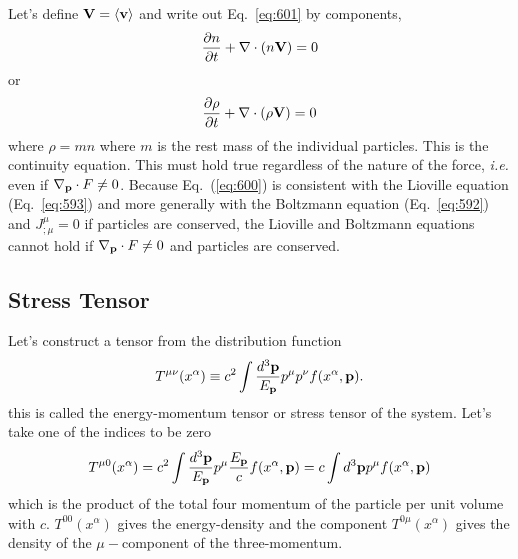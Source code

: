 Let's define ${\bf V}=\langle {\bf v} \rangle$ and write out Eq.~\ref{eq:601}
by components,
\begin{equation}
\frac{\partial {n}}{\partial {t}} + \nabla \cdot \left (n {\bf V} \right ) = 0 
\label{eq:602}
\end{equation}
or
\begin{equation}
\frac{\partial {\rho}}{\partial {t}} + \nabla \cdot \left (\rho {\bf V} \right ) = 0 
\label{eq:603}
\end{equation}
where $\rho=mn$ where $m$ is the rest mass of the individual particles.
This is the continuity equation.  This must hold true regardless of
the nature of the force, {\em i.e.} even if $\nabla_{\bf p} \cdot F
\neq 0$.  Because Eq.~(\ref{eq:600}) is consistent with the Lioville
equation (Eq.~\ref{eq:593}) and more generally with the Boltzmann
equation (Eq.~\ref{eq:592}) and $J^\mu_{;\mu}=0$ if particles are
conserved,  the Lioville and Boltzmann equations cannot hold if 
$\nabla_{\bf p} \cdot F \neq 0$ and particles are conserved.

\subsection{Stress Tensor}
\label{sec:stress-tensor}

Let's construct a tensor from the distribution function
\begin{equation}
T^{\mu\nu} (x^\alpha)  \equiv c^2 \int \frac{d^3 {\bf p}}{E_{\bf p}}
p^\mu p^\nu f(x^\alpha, {\bf p}).
\label{eq:604}
\end{equation}
this is called the energy-momentum tensor or stress tensor of the
system.  Let's take one of the indices to be zero
\begin{equation}
T^{\mu 0} (x^\alpha) = c^2 \int \frac{d^3 {\bf p}}{E_{\bf p}}
p^\mu \frac{E_{\bf p}}{c} f(x^\alpha, {\bf p}) = 
c \int d^3 {\bf p} p^\mu f(x^\alpha, {\bf p})
\label{eq:605}
\end{equation}
which is the product of the total four momentum of the particle per
unit volume with $c$.  $T^{00}(x^\alpha)$ gives the energy-density and
the component $T^{0\mu}(x^\alpha)$ gives the density of the 
$\mu-$component of the three-momentum.

